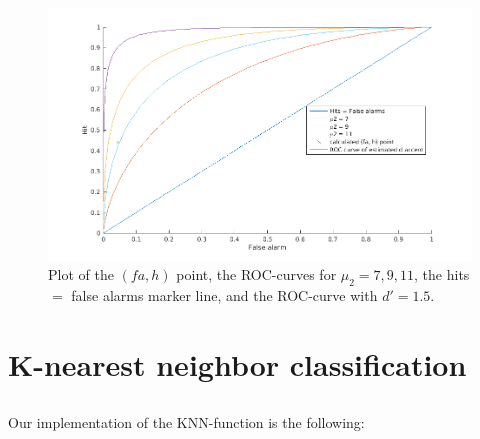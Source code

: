 \documentclass[10pt]{article}
\begin{document}
\begin{figure}[H]
 \centering
 \includegraphics[width=\textwidth]{assign1_2b.png}
 \caption{Plot of the $(fa, h)$ point, the ROC-curves for $\mu_2={7, 9, 11}$, the hits $=$ false alarms marker line, and the ROC-curve with $d'=1.5$.}
 \label{fig1.2}
\end{figure}

\section{K-nearest neighbor classification}
\subsection{}
Our implementation of the KNN-function is the following:

\end{document}
